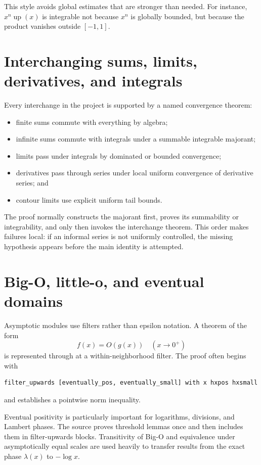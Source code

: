 \documentclass[11pt,oneside]{report}
\theoremstyle{definition}
\theoremstyle{remark}
\DeclareRobustCommand{\lean}[1]{\texorpdfstring{\texttt{\expandafter\seqsplit\expandafter{\detokenize{#1}}}}{\detokenize{#1}}}
\newcommand{\upf}{\operatorname{up}}
\begin{document}
This style avoids global estimates that are stronger than needed.  For instance, \(x^n\upf(x)\) is integrable not because \(x^n\) is globally bounded, but because the product vanishes outside \([-1,1]\).

\section{Interchanging sums, limits, derivatives, and integrals}
Every interchange in the project is supported by a named convergence theorem:
\begin{itemize}
  \item finite sums commute with everything by algebra;
  \item infinite sums commute with integrals under a summable integrable majorant;
  \item limits pass under integrals by dominated or bounded convergence;
  \item derivatives pass through series under local uniform convergence of derivative series; and
  \item contour limits use explicit uniform tail bounds.
\end{itemize}
The proof normally constructs the majorant first, proves its summability or integrability, and only then invokes the interchange theorem.  This order makes failures local: if an informal series is not uniformly controlled, the missing hypothesis appears before the main identity is attempted.

\section{Big-O, little-o, and eventual domains}
Asymptotic modules use filters rather than epsilon notation.  A theorem of the form
\[
  f(x)=O(g(x))\quad(x\to0^+)
\]
is represented through \lean{IsBigO} at a within-neighborhood filter.  The proof often begins with
\begin{lstlisting}
filter_upwards [eventually_pos, eventually_small] with x hxpos hxsmall
\end{lstlisting}
and establishes a pointwise norm inequality.

Eventual positivity is particularly important for logarithms, divisions, and Lambert phases.  The source proves threshold lemmas once and then includes them in filter-upwards blocks.  Transitivity of Big-O and equivalence under asymptotically equal scales are used heavily to transfer results from the exact phase \(\lambda(x)\) to \(-\log x\).
\end{document}
